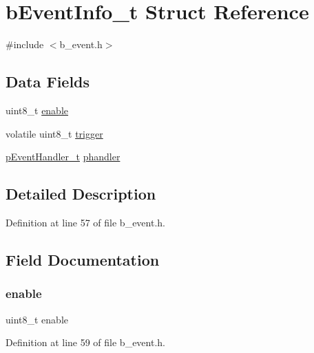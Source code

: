 \hypertarget{structb_event_info__t}{}\section{b\+Event\+Info\+\_\+t Struct Reference}
\label{structb_event_info__t}


{\ttfamily \#include $<$b\+\_\+event.\+h$>$}

\subsection*{Data Fields}
\begin{DoxyCompactItemize}
\item 
uint8\+\_\+t \mbox{\hyperlink{structb_event_info__t_a324d63698d720716b386efb308337af8}{enable}}
\item 
volatile uint8\+\_\+t \mbox{\hyperlink{structb_event_info__t_aad577ce52c9a28d35802f282ee12246d}{trigger}}
\item 
\mbox{\hyperlink{group___e_v_e_n_t___exported___types_definitions_ga42b0d7ce13d1e439f8fe00eec38e90d1}{p\+Event\+Handler\+\_\+t}} \mbox{\hyperlink{structb_event_info__t_a9fbd366c3d5dee62ece2b2217959c27e}{phandler}}
\end{DoxyCompactItemize}


\subsection{Detailed Description}


Definition at line 57 of file b\+\_\+event.\+h.



\subsection{Field Documentation}
\mbox{\label{structb_event_info__t_a324d63698d720716b386efb308337af8}} 
\subsubsection{\texorpdfstring{enable}{enable}}
{\footnotesize\ttfamily uint8\+\_\+t enable}



Definition at line 59 of file b\+\_\+event.\+h.

